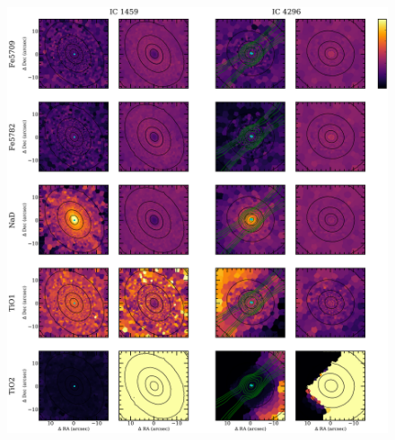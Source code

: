		\begin{figure}
			\centering
			\includegraphics[height=0.67\textheight]{chapter4/muse/abs1b.png}
		\end{figure}
